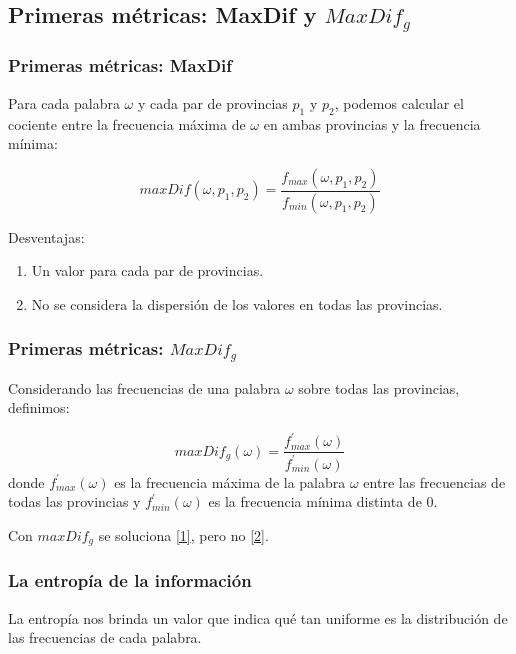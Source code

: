 
\subsection{Primeras métricas: MaxDif y $MaxDif_g$} 

\begin{frame}[t]\frametitle{Primeras métricas: MaxDif}
Para cada palabra $\omega$ y cada par de provincias $p_1$ y $p_2$, podemos calcular el cociente entre la frecuencia máxima de $\omega$ en ambas provincias y la frecuencia mínima:

\begin{equation}
  \label{eq:maxDif} 
  maxDif(\omega,p_1,p_2) = \frac{f_{max}(\omega,p_1,p_2)}{f_{min}(\omega,p_1,p_2)}
\end{equation}

Desventajas:  
\begin{enumerate}
    \item \label{1} Un valor para cada par de provincias.
    \item \label{2} No se considera la dispersión de los valores en todas las provincias.
\end{enumerate}

\end{frame}

\begin{frame}[t]\frametitle{Primeras métricas: $MaxDif_g$}

Considerando las frecuencias de una palabra $\omega$ sobre todas las provincias, definimos:

\begin{equation}
 maxDif_g(\omega) = \frac{f_{max}^\prime(\omega)}{f_{min}^\prime(\omega)}
 \label{eq:maxDifg}  
\end{equation} 
donde $f_{max}^\prime(\omega)$ es la frecuencia máxima de la palabra $\omega$ entre las frecuencias de todas las provincias y $f_{min}^\prime(\omega)$ es la frecuencia mínima distinta de $0$.

Con $maxDif_g$ se soluciona \ref{1}, pero no \ref{2}.


\end{frame}


\begin{frame}[t]\frametitle{La entropía de la información}
    
La entropía nos brinda un valor que indica qué tan uniforme es la distribución de las frecuencias de cada palabra. 

\end{frame}

